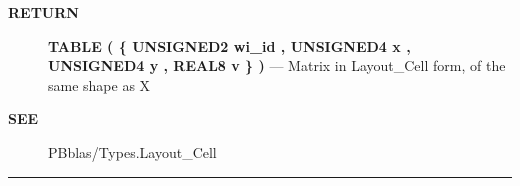 \par
\begin{description}
\item [\colorbox{tagtype}{\color{white} \textbf{\textsf{RETURN}}}] \textbf{TABLE ( \{ UNSIGNED2 wi\_id , UNSIGNED4 x , UNSIGNED4 y , REAL8 v \} )} --- Matrix in Layout\_Cell form, of the same shape as X
\end{description}






\par
\begin{description}
\item [\colorbox{tagtype}{\color{white} \textbf{\textsf{SEE}}}] PBblas/Types.Layout\_Cell
\end{description}




\rule{\linewidth}{0.5pt}
